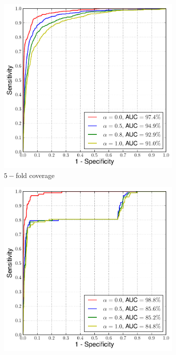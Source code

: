  \begin{figure}
\centering
\begin{subfigure}{.33\textwidth}
  \centering
  \includegraphics[width=\linewidth]{Figure9-5fold-b}
  \caption{$5-$fold coverage}
\end{subfigure}%
\begin{subfigure}{.33\textwidth}
  \centering
  \includegraphics[width=\linewidth]{Figure10-10fold-b}

\end{subfigure}
\end{figure}
